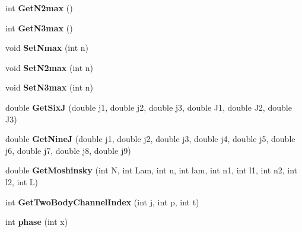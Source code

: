 \begin{DoxyCompactItemize}
\item 
\hypertarget{classModelSpace_a415e7663769bcab236a66c9914f9ff13}{int {\bfseries Get\-N2max} ()}\label{classModelSpace_a415e7663769bcab236a66c9914f9ff13}

\item 
\hypertarget{classModelSpace_a15a5f8ef44f769c052ae1ae5d475fc01}{int {\bfseries Get\-N3max} ()}\label{classModelSpace_a15a5f8ef44f769c052ae1ae5d475fc01}

\item 
\hypertarget{classModelSpace_a1a50d734edaef5cb3bd79a4707ef1e82}{void {\bfseries Set\-Nmax} (int n)}\label{classModelSpace_a1a50d734edaef5cb3bd79a4707ef1e82}

\item 
\hypertarget{classModelSpace_ab13111671fc76cf1c52b98a3f78a1dcd}{void {\bfseries Set\-N2max} (int n)}\label{classModelSpace_ab13111671fc76cf1c52b98a3f78a1dcd}

\item 
\hypertarget{classModelSpace_a432f3913aa487bf7fc7c4eb5a2197599}{void {\bfseries Set\-N3max} (int n)}\label{classModelSpace_a432f3913aa487bf7fc7c4eb5a2197599}

\item 
\hypertarget{classModelSpace_a716c2bf4a6b42c1c27579b0b7804252e}{double {\bfseries Get\-Six\-J} (double j1, double j2, double j3, double J1, double J2, double J3)}\label{classModelSpace_a716c2bf4a6b42c1c27579b0b7804252e}

\item 
\hypertarget{classModelSpace_ab9303a5a0cc4513bf4ed4430d9fe86a6}{double {\bfseries Get\-Nine\-J} (double j1, double j2, double j3, double j4, double j5, double j6, double j7, double j8, double j9)}\label{classModelSpace_ab9303a5a0cc4513bf4ed4430d9fe86a6}

\item 
\hypertarget{classModelSpace_a85f0b95b2cd46504702ea80489455beb}{double {\bfseries Get\-Moshinsky} (int N, int Lam, int n, int lam, int n1, int l1, int n2, int l2, int L)}\label{classModelSpace_a85f0b95b2cd46504702ea80489455beb}

\item 
\hypertarget{classModelSpace_ae73e211248e6f2bd4cc1bb0f030144ce}{int {\bfseries Get\-Two\-Body\-Channel\-Index} (int j, int p, int t)}\label{classModelSpace_ae73e211248e6f2bd4cc1bb0f030144ce}

\item 
\hypertarget{classModelSpace_a6b4d1686088e3fef492df10bbd806fe2}{int {\bfseries phase} (int x)}\label{classModelSpace_a6b4d1686088e3fef492df10bbd806fe2}


\end{DoxyCompactItemize}
